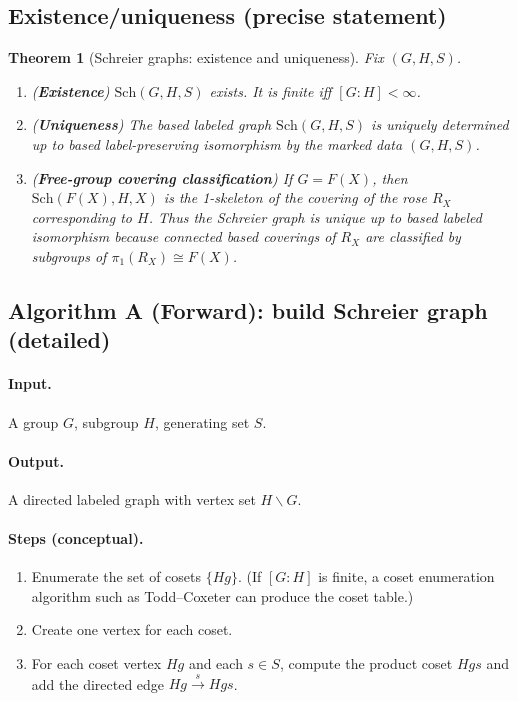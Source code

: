 \documentclass[11pt]{article}
\newtheorem{theorem}{Theorem}[section]
\theoremstyle{definition}
\theoremstyle{plain}
\theoremstyle{remark}
\newcommand{\Sch}{\mathrm{Sch}}
\begin{document}
\subsection*{Existence/uniqueness (precise statement)}
\begin{theorem}[Schreier graphs: existence and uniqueness]\label{thm:schreier}
Fix $(G,H,S)$.
\begin{enumerate}[leftmargin=2.2em]
\item (\textbf{Existence}) $\Sch(G,H,S)$ exists. It is finite iff $[G:H]<\infty$.
\item (\textbf{Uniqueness}) The based labeled graph $\Sch(G,H,S)$ is uniquely determined up to based label-preserving isomorphism by the marked data $(G,H,S)$.
\item (\textbf{Free-group covering classification}) If $G=F(X)$, then $\Sch(F(X),H,X)$ is the 1-skeleton of the covering of the rose $R_X$ corresponding to $H$.
Thus the Schreier graph is unique up to based labeled isomorphism because connected based coverings of $R_X$ are classified by subgroups of $\pi_1(R_X)\cong F(X)$.
\end{enumerate}
\end{theorem}

\subsection*{Algorithm A (Forward): build Schreier graph (detailed)}\cite{schreier1927,toddcoxeter1936,serre1980trees,holt2005}
\paragraph{Input.} A group $G$, subgroup $H$, generating set $S$.

\paragraph{Output.}
A directed labeled graph with vertex set $H\backslash G$.

\paragraph{Steps (conceptual).}
\begin{enumerate}[leftmargin=2.2em]
\item Enumerate the set of cosets $\{Hg\}$.
(If $[G:H]$ is finite, a coset enumeration algorithm such as Todd--Coxeter can produce the coset table.)
\item Create one vertex for each coset.
\item For each coset vertex $Hg$ and each $s\in S$, compute the product coset $Hgs$ and add the directed edge $Hg\xrightarrow{s}Hgs$.
\end{enumerate}
\end{document}
